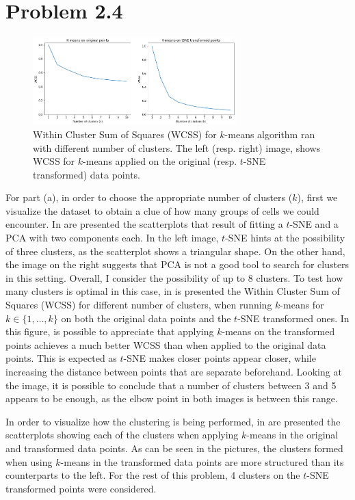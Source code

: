 \documentclass[11pt, english, twocolumn]{article}
\begin{document}
\section*{Problem 2.4}


\begin{figure}[t]
	\centering
	\includegraphics[width=0.7\textwidth]{fit-clusters}
	\caption{Within Cluster Sum of Squares (WCSS) for $k$-means algorithm ran with different number of clusters. The left (resp. right) image, shows WCSS for $k$-means applied on the original (resp. $t$-SNE transformed) data points.}
	\label{fig:fit-clusters}
\end{figure}


For part (a), in order to choose the appropriate number of clusters ($k$), first we visualize the dataset to obtain a clue of how many groups of cells we could encounter. In  are presented the scatterplots that result of fitting a $t$-SNE and a PCA with two components each. In the left image, $t$-SNE hints at the possibility of three clusters, as the scatterplot shows a triangular shape. On the other hand, the image on the right suggests that PCA is not a good tool to search for clusters in this setting. Overall, I consider the possibility of up to 8 clusters. To test how many clusters is optimal in this case, in  is presented the Within Cluster Sum of Squares (WCSS) for different number of clusters, when running $k$-means for $k \in \{1,\ldots,k\}$ on both the original data points and the $t$-SNE transformed ones. In this figure, is possible to appreciate that applying $k$-means on the transformed points achieves a much better WCSS than when applied to the original data points. This is expected as $t$-SNE makes closer points appear closer, while increasing the distance between points that are separate beforehand. Looking at the image, it is possible to conclude that a number of clusters between 3 and 5 appears to be enough, as the elbow point in both images is between this range. 

In order to visualize how the clustering is being performed, in  are presented the scatterplots showing each of the clusters when applying $k$-means in the original and transformed data points. As can be seen in the pictures, the clusters formed when using $k$-means in the transformed data points are more structured than its counterparts to the left. For the rest of this problem, 4 clusters on the $t$-SNE transformed points were considered.
\end{document}
